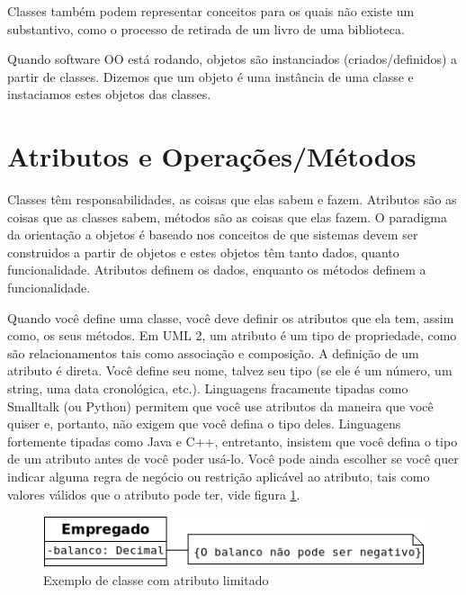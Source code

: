 \documentclass[
	article,			%
	12pt,				%
	openright,
	twoside,			%
	a4paper,			%
	english,			%
	french,
	brazil,				%
	sumario=tradicional
	]{abntex2}
\begin{document}
Classes também podem representar conceitos para os quais não existe um substantivo, como o processo de retirada de um livro de uma biblioteca.

Quando software OO está rodando, objetos são instanciados (criados/definidos) a partir de classes. Dizemos que um objeto é uma instância de uma classe e instaciamos estes objetos das classes.

\section{Atributos e Operações/Métodos}

Classes têm responsabilidades, as coisas que elas sabem e fazem. Atributos são as coisas que as classes sabem, métodos são as coisas que elas fazem. O paradigma da orientação a objetos é baseado nos conceitos de que sistemas devem ser construidos a partir de objetos e estes objetos têm tanto dados, quanto funcionalidade. Atributos definem os dados, enquanto os métodos definem a funcionalidade.

Quando você define uma classe, você deve definir os atributos que ela tem, assim como, os seus métodos. Em UML 2, um atributo é um tipo de propriedade, como são relacionamentos tais como associação e composição. A definição de um atributo é direta. Você define seu nome, talvez seu tipo (se ele é um número, um string, uma data cronológica, etc.).  Linguagens fracamente tipadas como Smalltalk (ou Python) permitem que você use atributos da maneira que você quiser e, portanto, não exigem que você defina o tipo deles. Linguagens fortemente tipadas como Java e C++, entretanto, insistem que você defina o tipo de um atributo antes de você poder usá-lo. Você pode ainda escolher se você quer indicar alguma regra de negócio ou restrição aplicável ao atributo, tais como valores válidos que o atributo pode ter, vide figura \ref{fig:umlClsLmt}.

\begin{figure}[h]
\begin{center}
\includegraphics[scale=0.7]{umlClsLmt.png} 
\caption{Exemplo de classe com atributo limitado} \label{fig:umlClsLmt}
\end{center}
\end{figure}
\end{document}
